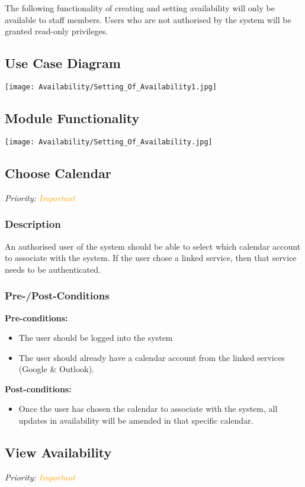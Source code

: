 The following functionality of creating and setting availability will only be available to staff members. Users who are not authorised by the system will be granted read-only privileges.
\subsection{Use Case Diagram}
\texttt{[image: Availability/Setting\_Of\_Availability1.jpg]}

\subsection{Module Functionality}
\texttt{[image: Availability/Setting\_Of\_Availability.jpg]}

\subsection{Choose Calendar}
\textit{Priority: \textcolor{orange}{Important}}
	\subsubsection{Description}
	An authorised user of the system should be able to select which calendar account to associate with the system. If the user chose a linked service, then that service needs to be authenticated.
	\subsubsection{Pre-/Post-Conditions}
		\textbf{Pre-conditions:} 
			\begin{itemize}
				\item The user should be logged into the system 
				\item The user should already have a calendar account from the linked services (Google \& Outlook).
			\end{itemize}
		\textbf{Post-conditions:} 
			\begin{itemize}
				\item Once the user has chosen the calendar to associate with the system, all updates in availability will be amended in that specific calendar.
			\end{itemize}

\subsection{View Availability}
\textit{Priority: \textcolor{orange}{Important}}
